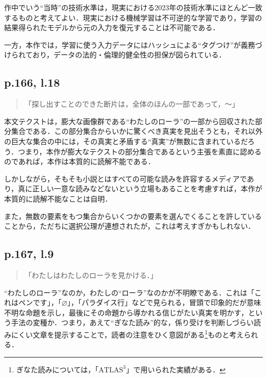 \documentclass[10pt, a5paper, twoside]{jsarticle}
\theoremstyle{definition}
\begin{document}
			作中でいう“当時”の技術水準は，現実における2023年の技術水準にほとんど一致するものと考えてよい．現実における機械学習は不可逆的な学習であり，学習の結果得られたモデルから元の入力を復元することは不可能である．

			一方，本作では，学習に使う入力データにはハッシュによる“タグつけ”が義務づけられており，データの法的・倫理的健全性の担保が図られている．

		\subsection{p.166, l.18}

			\begin{quote}
				
				「探し出すことのできた断片は，全体のほんの一部であって，〜」

			\end{quote}

			本文テクストは，膨大な画像群である“わたしのローラ”の一部から回収された部分集合である．この部分集合からいかに驚くべき真実を見出そうとも，それ以外の巨大な集合の中には，その真実と矛盾する“真実”が無数に含まれているだろう．つまり，本作が膨大なテクストの部分集合であるという主張を素直に認めるのであれば，本作は本質的に読解不能である．

			しかしながら，そもそも小説とはすべての可能な読みを許容するメディアであり，真に正しい一意な読みなどないという立場もあることを考慮すれば，本作が本質的に読解不能なことは自明．

			また，無数の要素をもつ集合からいくつかの要素を選んでくることを許していることから，ただちに選択公理が連想されたが，これは考えすぎかもしれない．

		\subsection{p.167, l.9}

			\begin{quote}
				
				「わたしはわたしのローラを見かける．」

			\end{quote}

			“わたしのローラ”なのか，わたしの“ローラ”なのかが不明瞭である．これは「これはペンです」，「$\varnothing$」，「パラダイス行」などで見られる，冒頭で印象的だが意味不明な命題を示し，最後にその命題から導かれる信じがたい真実を明かす，という手法の変種か．つまり，あえて“ぎなた読み”的な，係り受けを判断しづらい読みにくい文章を提示することで，読者の注意をひく意図がある\footnote{ぎなた読みについては，「$\text{ATLAS}^3$」で用いられた実績がある．}ものと考えられる．
\end{document}
